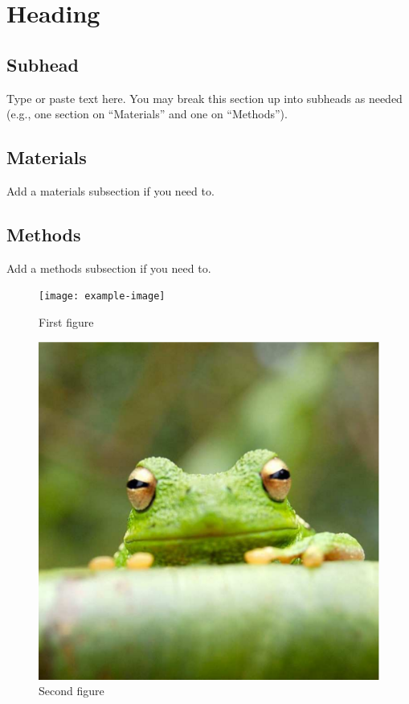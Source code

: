 \documentclass[9pt,twoside,lineno]{pnas-new-si}
\begin{document}
\section*{Heading}
\subsection*{Subhead}
Type or paste text here. You may break this section up into subheads as needed (e.g., one section on ``Materials'' and one on ``Methods'').

\subsection*{Materials}
Add a materials subsection if you need to.

\subsection*{Methods}
Add a methods subsection if you need to.


\begin{figure}
\centering
\texttt{[image: example-image]}
\caption{First figure}
\end{figure}

\begin{figure}
\centering
\includegraphics[width=\textwidth]{frog}
\caption{Second figure}
\end{figure}
\end{document}
